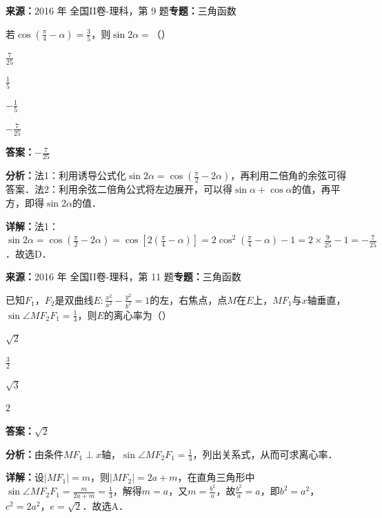 \begin{question}[points=5]
\textbf{来源：}2016 年 全国II卷-理科，第 9 题\quad \textbf{专题：}三角函数\par
若$\cos\left(\frac{\pi}{4}-\alpha\right)=\frac{3}{5}$，则$\sin2\alpha=$（\quad）
\begin{choices}
  \item $\frac{7}{25}$
  \item $\frac{1}{5}$
  \item $-\frac{1}{5}$
  \item $-\frac{7}{25}$
\end{choices}
\begin{solution}
\textbf{答案：}$-\frac{7}{25}$

\textbf{分析：}法1：利用诱导公式化$\sin2\alpha=\cos\left(\frac{\pi}{2}-2\alpha\right)$，再利用二倍角的余弦可得答案．法2：利用余弦二倍角公式将左边展开，可以得$\sin\alpha+\cos\alpha$的值，再平方，即得$\sin2\alpha$的值．

\textbf{详解：}法1：$\sin2\alpha=\cos\left(\frac{\pi}{2}-2\alpha\right)=\cos\left[2\left(\frac{\pi}{4}-\alpha\right)\right]=2\cos^2\left(\frac{\pi}{4}-\alpha\right)-1=2\times\frac{9}{25}-1=-\frac{7}{25}$．故选D．
\end{solution}
\end{question}

\begin{question}[points=5]
\textbf{来源：}2016 年 全国II卷-理科，第 11 题\quad \textbf{专题：}三角函数\par
已知$F_1$，$F_2$是双曲线$E:\frac{x^2}{a^2}-\frac{y^2}{b^2}=1$的左，右焦点，点$M$在$E$上，$MF_1$与$x$轴垂直，$\sin\angle MF_2F_1=\frac{1}{3}$，则$E$的离心率为（\quad）
\begin{choices}
  \item $\sqrt{2}$
  \item $\frac{3}{2}$
  \item $\sqrt{3}$
  \item $2$
\end{choices}
\begin{solution}
\textbf{答案：}$\sqrt{2}$

\textbf{分析：}由条件$MF_1\perp x$轴，$\sin\angle MF_2F_1=\frac13$，列出关系式，从而可求离心率．

\textbf{详解：}设$|MF_1|=m$，则$|MF_2|=2a+m$，在直角三角形中$\sin\angle MF_2F_1=\frac{m}{2a+m}=\frac13$，解得$m=a$，又$m=\frac{b^2}{a}$，故$\frac{b^2}{a}=a$，即$b^2=a^2$，$c^2=2a^2$，$e=\sqrt{2}$．故选A．
\end{solution}
\end{question}

